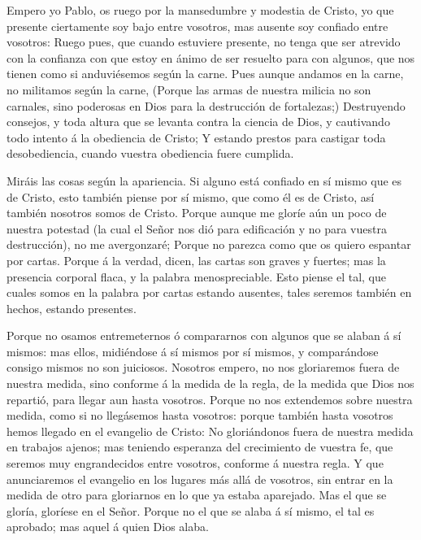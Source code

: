  Empero yo Pablo, os ruego por la mansedumbre y modestia de
Cristo, yo que presente ciertamente soy bajo entre vosotros, mas ausente
soy confiado entre vosotros:  Ruego pues, que cuando
estuviere presente, no tenga que ser atrevido con la confianza con que
estoy en ánimo de ser resuelto para con algunos, que nos tienen como si
anduviésemos según la carne.  Pues aunque andamos en la
carne, no militamos según la carne,  (Porque las armas de
nuestra milicia no son carnales, sino poderosas en Dios para la
destrucción de fortalezas;)  Destruyendo consejos, y toda
altura que se levanta contra la ciencia de Dios, y cautivando todo
intento á la obediencia de Cristo;  Y estando prestos para
castigar toda desobediencia, cuando vuestra obediencia fuere cumplida.

 Miráis las cosas según la apariencia. Si alguno está
confiado en sí mismo que es de Cristo, esto también piense por sí mismo,
que como él es de Cristo, así también nosotros somos de Cristo.
 Porque aunque me gloríe aún un poco de nuestra potestad (la
cual el Señor nos dió para edificación y no para vuestra destrucción),
no me avergonzaré;  Porque no parezca como que os quiero
espantar por cartas.  Porque á la verdad, dicen, las cartas
son graves y fuertes; mas la presencia corporal flaca, y la palabra
menospreciable.  Esto piense el tal, que cuales somos en la
palabra por cartas estando ausentes, tales seremos también en hechos,
estando presentes.

 Porque no osamos entremeternos ó compararnos con algunos
que se alaban á sí mismos: mas ellos, midiéndose á sí mismos por sí
mismos, y comparándose consigo mismos no son juiciosos. 
Nosotros empero, no nos gloriaremos fuera de nuestra medida, sino
conforme á la medida de la regla, de la medida que Dios nos repartió,
para llegar aun hasta vosotros.  Porque no nos extendemos
sobre nuestra medida, como si no llegásemos hasta vosotros: porque
también hasta vosotros hemos llegado en el evangelio de Cristo:
 No gloriándonos fuera de nuestra medida en trabajos
ajenos; mas teniendo esperanza del crecimiento de vuestra fe, que
seremos muy engrandecidos entre vosotros, conforme á nuestra regla.
 Y que anunciaremos el evangelio en los lugares más allá de
vosotros, sin entrar en la medida de otro para gloriarnos en lo que ya
estaba aparejado.  Mas el que se gloría, gloríese en el
Señor.  Porque no el que se alaba á sí mismo, el tal es
aprobado; mas aquel á quien Dios alaba.

